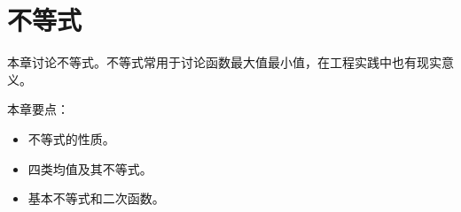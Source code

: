 \chapter{不等式}

本章讨论不等式。不等式常用于讨论函数最大值最小值，在工程实践中也有现实意义。

本章要点：
\begin{itemize}
    \item 不等式的性质。
    \item 四类均值及其不等式。
    \item 基本不等式和二次函数。
\end{itemize}

\newpage


\newpage


\newpage


\newpage


\newpage





